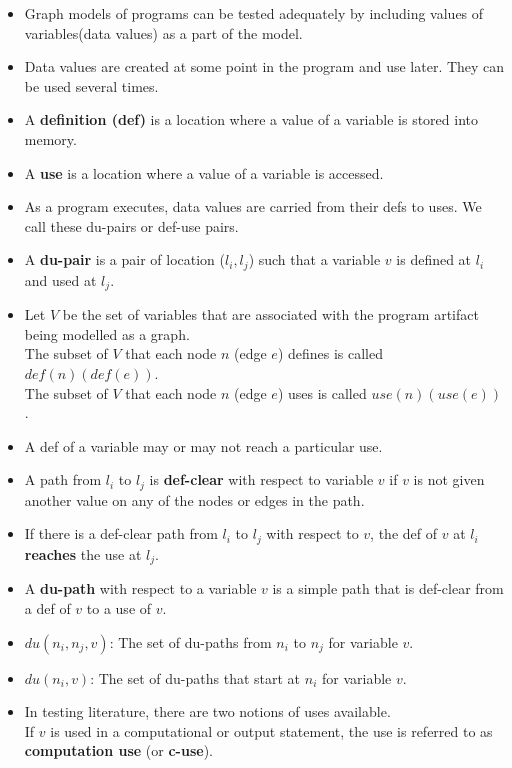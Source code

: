 \documentclass[a4paper]{article}
\begin{document}
\begin{itemize}
    \item Graph models of programs can be tested adequately by including values of variables(data values) as a part of the model.
    \item Data values are created at some point in the program and use later. They can be used several times.
    \item A \textbf{definition (def)} is a location where a value of a variable is stored into memory.
    \item A \textbf{use} is a location where a value of a variable is accessed.
    \item As a program executes, data values are carried from their defs to uses. We call these du-pairs or def-use pairs.
    \item A \textbf{du-pair} is a pair of location ($l_i,l_j$) such that a variable $v$ is defined at $l_i$ and used at $l_j$.
    \item Let $V$ be the set of variables that are associated with the program artifact being modelled as a graph.\\
    The subset of $V$ that each node $n$ (edge $e$) defines is called $def(n)(def(e))$.\\
    The subset of $V$ that each node $n$ (edge $e$) uses is called $use(n)(use(e))$.
    \item A def of a variable may or may not reach a particular use.
    \item A path from $l_i$ to $l_j$ is \textbf{def-clear} with respect to variable $v$ if $v$ is not given another value on any of the nodes or edges in the path.
    \item If there is a def-clear path from $l_i$ to $l_j$ with respect to $v$, the def of $v$ at $l_i$ \textbf{reaches} the use at $l_j$.
    \item A \textbf{du-path} with respect to a variable $v$ is a simple path that is def-clear from a def of $v$ to a use of $v$.
    \item $du(n_i,n_j,v)$: The set of du-paths from $n_i$ to $n_j$ for variable $v$.
    \item $du(n_i,v)$: The set of du-paths that start at $n_i$ for variable $v$.
    \item In testing literature, there are two notions of uses available.\\
    If $v$ is used in a computational or output statement, the use is referred to as \textbf{computation use} (or \textbf{c-use}).\\

\end{itemize}
\end{document}
